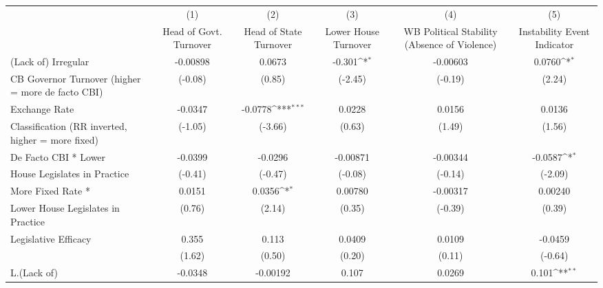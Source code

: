{
\def\sym#1{\ifmmode^{#1}\else\(^{#1}\)\fi}
\begin{tabular}{l*{5}{c}}
\hline\hline
                    &\multicolumn{1}{c}{(1)}&\multicolumn{1}{c}{(2)}&\multicolumn{1}{c}{(3)}&\multicolumn{1}{c}{(4)}&\multicolumn{1}{c}{(5)}\\
                    &\multicolumn{1}{c}{Head of Govt. Turnover}&\multicolumn{1}{c}{Head of State Turnover}&\multicolumn{1}{c}{Lower House Turnover}&\multicolumn{1}{c}{WB Political Stability (Absence of Violence)}&\multicolumn{1}{c}{Instability Event Indicator}\\
\hline
(Lack of) Irregular &    -0.00898         &      0.0673         &      -0.301\sym{*}  &    -0.00603         &      0.0760\sym{*}  \\
CB Governor Turnover (higher = more de facto CBI)&     (-0.08)         &      (0.85)         &     (-2.45)         &     (-0.19)         &      (2.24)         \\
[1em]
Exchange Rate       &     -0.0347         &     -0.0778\sym{***}&      0.0228         &      0.0156         &      0.0136         \\
Classification (RR inverted, higher = more fixed)&     (-1.05)         &     (-3.66)         &      (0.63)         &      (1.49)         &      (1.56)         \\
[1em]
De Facto CBI * Lower&     -0.0399         &     -0.0296         &    -0.00871         &    -0.00344         &     -0.0587\sym{*}  \\
House Legislates in Practice&     (-0.41)         &     (-0.47)         &     (-0.08)         &     (-0.14)         &     (-2.09)         \\
[1em]
More Fixed Rate *   &      0.0151         &      0.0356\sym{*}  &     0.00780         &    -0.00317         &     0.00240         \\
Lower House Legislates in Practice&      (0.76)         &      (2.14)         &      (0.35)         &     (-0.39)         &      (0.39)         \\
[1em]
Legislative Efficacy&       0.355         &       0.113         &      0.0409         &      0.0109         &     -0.0459         \\
                    &      (1.62)         &      (0.50)         &      (0.20)         &      (0.11)         &     (-0.64)         \\
[1em]
L.(Lack of)         &     -0.0348         &    -0.00192         &       0.107         &      0.0269         &       0.101\sym{**} \\

\end{tabular}}
